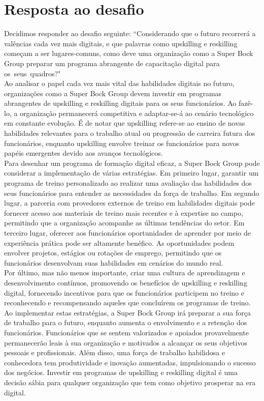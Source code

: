 \chapter{Resposta ao desafio}
\label{Chapter4} %
Decidimos responder ao desafio seguinte: “Considerando que o futuro recorrerá a valências cada vez mais digitais, e que palavras como upskilling e reskilling começam a ser lugares-comuns, como deve uma organização como a Super Bock Group preparar um programa abrangente de capacitação digital para os seus quadros?"\\

Ao analisar o papel cada vez mais vital das habilidades digitais no futuro, organizações como a Super Bock Group devem investir em programas abrangentes de upskilling e reskilling digitais para os seus funcionários. Ao fazê-lo, a organização permanecerá competitiva e adaptar-se-á ao cenário tecnológico em constante evolução. É de notar que upskilling refere-se ao ensino de novas habilidades relevantes para o trabalho atual ou progressão de carreira futura dos funcionários, enquanto upskilling envolve treinar os funcionários para novos papéis emergentes devido aos avanços tecnológicos.\\

Para desenhar um programa de formação digital eficaz, a Super Bock Group pode considerar a implementação de várias estratégias. Em primeiro lugar, garantir um programa de treino personalizado ao realizar uma avaliação das habilidades dos seus funcionários para entender as necessidades da força de trabalho. Em segundo lugar, a parceria com provedores externos de treino em habilidades digitais pode fornecer acesso aos materiais de treino mais recentes e à expertise no campo, permitindo que a organização acompanhe as últimas tendências do setor. Em terceiro lugar, oferecer aos funcionários oportunidades de aprender por meio de experiência prática pode ser altamente benéfico. As oportunidades podem envolver projetos, estágios ou rotações de emprego, permitindo que os funcionários desenvolvam suas habilidades em cenários do mundo real.\\

Por último, mas não menos importante, criar uma cultura de aprendizagem e desenvolvimento contínuos, promovendo os benefícios de upskilling e reskilling digital, fornecendo incentivos para que os funcionários participem no treino e reconhecendo e recompensando aqueles que concluírem os programas de treino. Ao implementar estas estratégias, a Super Bock Group irá preparar a sua força de trabalho para o futuro, enquanto aumenta o envolvimento e a retenção dos funcionários. Funcionários que se sentem valorizados e apoiados provavelmente permanecerão leais à sua organização e motivados a alcançar os seus objetivos pessoais e profissionais. Além disso, uma força de trabalho habilidosa e conhecedora tem produtividade e inovação aumentadas, impulsionando o sucesso dos negócios. Investir em programas de upskilling e reskilling digital é uma decisão sábia para qualquer organização que tem como objetivo prosperar na era digital.
